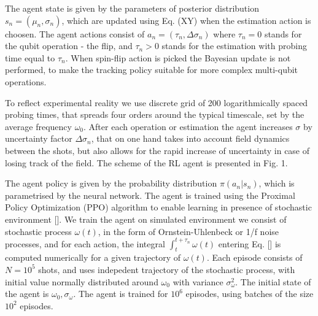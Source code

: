 \documentclass[aps,twocolumn,pra,notitlepage,]{revtex4-2}
\begin{document}
The agent state is given by the parameters of posterior distribution $s_n = (\mu_n,\sigma_n)$, which are updated using Eq. (XY) when the estimation action is choosen. The agent actions consist of $a_n = (\tau_n, \Delta \sigma_n)$ where $\tau_n=0$ stands for the qubit operation - the flip, and $\tau_n > 0$ stands for the estimation with probing time equal to $\tau_n$. When spin-flip action is picked the Bayesian update is not performed, to make the tracking policy suitable for more complex multi-qubit operations.

To reflect experimental reality we use discrete grid of 200 logarithmically spaced probing times, that spreads four orders around the typical timescale, set by the average frequency $\omega_0$. After each operation or estimation the agent increases $\sigma$ by uncertainty factor $\Delta \sigma_n$, that on one hand takes into account field dynamics between the shots, but also allows for the rapid increase of uncertainty in case of losing track of the field. The scheme of the RL agent is presented in Fig. 1.

The agent policy is given by the probability distribution $\pi(a_n|s_n)$, which is parametrised by the neural network. The agent is trained using the Proximal Policy Optimization (PPO) algorithm to enable learning in presence of stochastic environment []. We train the agent on simulated environment we consist of stochastic process $\omega(t)$, in the form of Ornstein-Uhlenbeck or 1/f noise processes, and for each action, the integral $\int_t^{t+\tau_n} \omega(t)$ entering Eq. [] is computed numerically for a given trajectory of $\omega(t)$. Each episode consists of $N=10^5$ shots, and uses indepedent trajectory of the stochastic process, with initial value normally distributed around $\omega_0$ with variance $\sigma_{\omega}^2$. The initial state of the agent is $\omega_0, \sigma_\omega$. The agent is trained for $10^6$ episodes, using batches of the size $10^2$ episodes.
\end{document}
